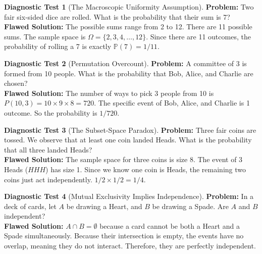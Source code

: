 \documentclass[11pt, letterpaper]{article}
\theoremstyle{definition}
\newtheorem{flaw}{Diagnostic Test}
\theoremstyle{remark}
\newcommand{\Prob}{\mathbb{P}}
\begin{document}
\begin{flaw}[The Macroscopic Uniformity Assumption]
    \textbf{Problem:} Two fair six-sided dice are rolled. What is the probability that their sum is 7? \\
    \textbf{Flawed Solution:} The possible sums range from 2 to 12. There are 11 possible sums. The sample space is $\Omega = \{2, 3, 4, \dots, 12\}$. Since there are 11 outcomes, the probability of rolling a 7 is exactly $\Prob(7) = 1/11$.
\end{flaw}

\begin{flaw}[Permutation Overcount]
    \textbf{Problem:} A committee of 3 is formed from 10 people. What is the probability that Bob, Alice, and Charlie are chosen? \\
    \textbf{Flawed Solution:} The number of ways to pick 3 people from 10 is $P(10, 3) = 10 \times 9 \times 8 = 720$. The specific event of Bob, Alice, and Charlie is 1 outcome. So the probability is $1/720$.
\end{flaw}

\begin{flaw}[The Subset-Space Paradox]
    \textbf{Problem:} Three fair coins are tossed. We observe that at least one coin landed Heads. What is the probability that all three landed Heads? \\
    \textbf{Flawed Solution:} The sample space for three coins is size 8. The event of 3 Heads ($HHH$) has size 1. Since we know one coin is Heads, the remaining two coins just act independently. $1/2 \times 1/2 = 1/4$.
\end{flaw}

\begin{flaw}[Mutual Exclusivity Implies Independence]
    \textbf{Problem:} In a deck of cards, let $A$ be drawing a Heart, and $B$ be drawing a Spade. Are $A$ and $B$ independent? \\
    \textbf{Flawed Solution:} $A \cap B = \emptyset$ because a card cannot be both a Heart and a Spade simultaneously. Because their intersection is empty, the events have no overlap, meaning they do not interact. Therefore, they are perfectly independent.
\end{flaw}

\vspace{1cm}
\end{document}
